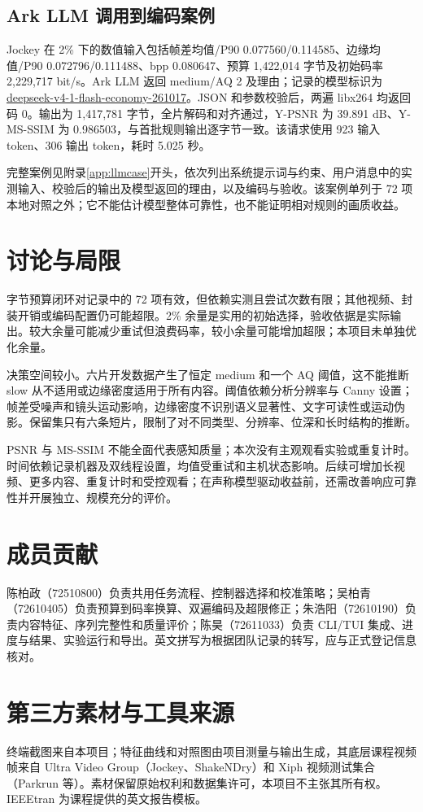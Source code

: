 \documentclass[UTF8,12pt,a4paper,twocolumn]{ctexart}
\begin{document}
\subsection{Ark LLM 调用到编码案例}
Jockey 在 2\% 下的数值输入包括帧差均值/P90 0.077560/0.114585、边缘均值/P90 0.072796/0.111488、bpp 0.080647、预算 1,422,014 字节及初始码率 2,229,717 bit/s。Ark LLM 返回 medium/AQ 2 及理由；记录的模型标识为 \url{deepseek-v4-1-flash-economy-261017}。JSON 和参数校验后，两遍 libx264 均返回码 0。输出为 1,417,781 字节，全片解码和对齐通过，Y-PSNR 为 39.891 dB、Y-MS-SSIM 为 0.986503，与首批规则输出逐字节一致。该请求使用 923 输入 token、306 输出 token，耗时 5.025 秒。

完整案例见附录\ref{app:llmcase}开头，依次列出系统提示词与约束、用户消息中的实测输入、校验后的输出及模型返回的理由，以及编码与验收。该案例单列于 72 项本地对照之外；它不能估计模型整体可靠性，也不能证明相对规则的画质收益。
\section{讨论与局限}
字节预算闭环对记录中的 72 项有效，但依赖实测且尝试次数有限；其他视频、封装开销或编码配置仍可能超限。2\% 余量是实用的初始选择，验收依据是实际输出。较大余量可能减少重试但浪费码率，较小余量可能增加超限；本项目未单独优化余量。

决策空间较小。六片开发数据产生了恒定 medium 和一个 AQ 阈值，这不能推断 slow 从不适用或边缘密度适用于所有内容。阈值依赖分析分辨率与 Canny 设置；帧差受噪声和镜头运动影响，边缘密度不识别语义显著性、文字可读性或运动伪影。保留集只有六条短片，限制了对不同类型、分辨率、位深和长时结构的推断。

PSNR 与 MS-SSIM 不能全面代表感知质量；本次没有主观观看实验或重复计时。时间依赖记录机器及双线程设置，均值受重试和主机状态影响。后续可增加长视频、更多内容、重复计时和受控观看；在声称模型驱动收益前，还需改善响应可靠性并开展独立、规模充分的评价。
\section{成员贡献}
陈柏政（72510800）负责共用任务流程、控制器选择和校准策略；吴柏青（72610405）负责预算到码率换算、双遍编码及超限修正；朱浩阳（72610190）负责内容特征、序列完整性和质量评价；陈昊（72611033）负责 CLI/TUI 集成、进度与结果、实验运行和导出。英文拼写为根据团队记录的转写，应与正式登记信息核对。
\section{第三方素材与工具来源}
终端截图来自本项目；特征曲线和对照图由项目测量与输出生成，其底层课程视频帧来自 Ultra Video Group（Jockey、ShakeNDry）和 Xiph 视频测试集合（Parkrun 等）。素材保留原始权利和数据集许可，本项目不主张其所有权。IEEEtran 为课程提供的英文报告模板。
\end{document}
